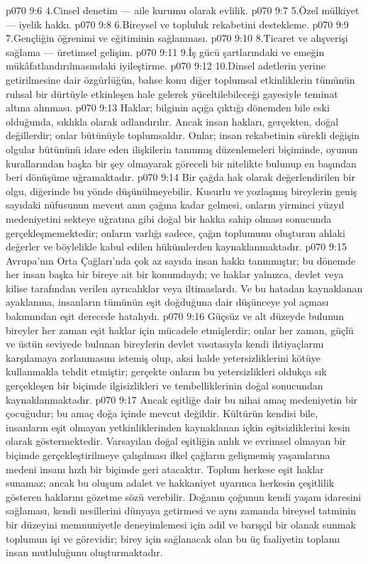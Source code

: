 \vs p070 9:6 4.\bibnobreakspace Cinsel denetim --- aile kurumu olarak evlilik.
\vs p070 9:7 5.\bibnobreakspace Özel mülkiyet --- iyelik hakkı.
\vs p070 9:8 6.\bibnobreakspace Bireysel ve topluluk rekabetini destekleme.
\vs p070 9:9 7.\bibnobreakspace Gençliğin öğrenimi ve eğitiminin sağlanması.
\vs p070 9:10 8.\bibnobreakspace Ticaret ve alışverişi sağlama --- üretimsel gelişim.
\vs p070 9:11 9.\bibnobreakspace İş gücü şartlarındaki ve emeğin mükâfatlandırılmasındaki iyileştirme.
\vs p070 9:12 10.\bibnobreakspace Dinsel adetlerin yerine getirilmesine dair özgürlüğün, bahse konu diğer toplumsal etkinliklerin tümünün ruhsal bir dürtüyle etkinleşen hale gelerek yüceltilebileceği gayesiyle teminat altına alınması.
\vs p070 9:13 Haklar; bilginin açığa çıktığı dönemden bile eski olduğunda, sıklıkla  olarak adlandırılır. Ancak insan hakları, gerçekten, doğal değillerdir; onlar bütünüyle toplumsaldır. Onlar; insan rekabetinin sürekli değişin olgular bütününü idare eden ilişkilerin tanınmış düzenlemeleri biçiminde, oyunun kurallarından başka bir şey olmayarak göreceli bir nitelikte bulunup en başından beri dönüşüme uğramaktadır.
\vs p070 9:14 Bir çağda hak olarak değerlendirilen bir olgu, diğerinde bu yönde düşünülmeyebilir. Kusurlu ve yozlaşmış bireylerin geniş sayıdaki nüfusunun mevcut anın çağına kadar gelmesi, onların yirminci yüzyıl medeniyetini sekteye uğratma gibi doğal bir hakka sahip olması sonucunda gerçekleşmemektedir; onların varlığı sadece, çağın toplumunu oluşturan ahlaki değerler ve böylelikle kabul edilen hükümlerden kaynaklanmaktadır.
\vs p070 9:15 Avrupa’nın Orta Çağları’nda çok az sayıda insan hakkı tanınmıştır; bu dönemde her insan başka bir bireye ait bir konumdaydı; ve haklar yalnızca, devlet veya kilise tarafından verilen ayrıcalıklar veya iltimaslardı. Ve bu hatadan kaynaklanan ayaklanma, insanların tümünün eşit doğduğuna dair düşünceye yol açması bakımından eşit derecede hatalıydı.
\vs p070 9:16 Güçsüz ve alt düzeyde bulunun bireyler her zaman eşit haklar için mücadele etmişlerdir; onlar her zaman, güçlü ve üstün seviyede bulunan bireylerin devlet vasıtasıyla kendi ihtiyaçlarını karşılamaya zorlanmasını istemiş olup, aksi halde yetersizliklerini kötüye kullanmakla tehdit etmiştir; gerçekte onların bu yetersizlikleri oldukça sık gerçekleşen bir biçimde ilgisizlikleri ve tembelliklerinin doğal sonucundan kaynaklanmaktadır.
\vs p070 9:17 Ancak eşitliğe dair bu nihai amaç medeniyetin bir çocuğudur; bu amaç doğa içinde mevcut değildir. Kültürün kendisi bile, insanların eşit olmayan yetkinliklerinden kaynaklanan içkin eşitsizliklerini kesin olarak göstermektedir. Varsayılan doğal eşitliğin anlık ve evrimsel olmayan bir biçimde gerçekleştirilmeye çalışılması ilkel çağların gelişmemiş yaşamlarına medeni insanı hızlı bir biçimde geri atacaktır. Toplum herkese eşit haklar sunamaz; ancak bu oluşum adalet ve hakkaniyet uyarınca herkesin çeşitlilik gösteren haklarını gözetme sözü verebilir. Doğanın çoğunun kendi yaşam idaresini sağlaması, kendi nesillerini dünyaya getirmesi ve aynı zamanda bireysel tatminin bir düzeyini memnuniyetle deneyimlemesi için adil ve barışçıl bir olanak sunmak toplumun işi ve görevidir; birey için sağlanacak olan bu üç faaliyetin toplamı insan mutluluğunu oluşturmaktadır.
